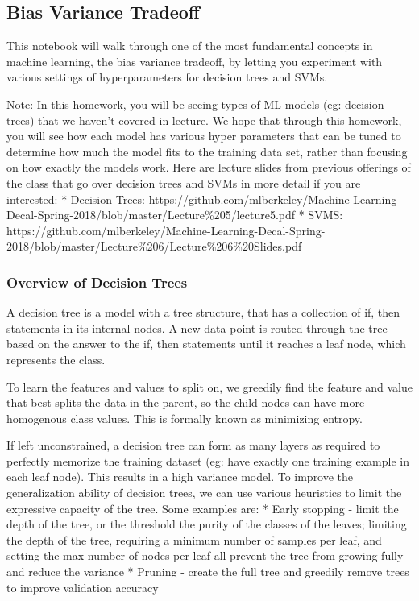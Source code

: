 \documentclass[11pt]{article}
\begin{document}
    \subsection{Bias Variance Tradeoff}\label{bias-variance-tradeoff}

This notebook will walk through one of the most fundamental concepts in
machine learning, the bias variance tradeoff, by letting you experiment
with various settings of hyperparameters for decision trees and SVMs.

Note: In this homework, you will be seeing types of ML models (eg:
decision trees) that we haven't covered in lecture. We hope that through
this homework, you will see how each model has various hyper parameters
that can be tuned to determine how much the model fits to the training
data set, rather than focusing on how exactly the models work. Here are
lecture slides from previous offerings of the class that go over
decision trees and SVMs in more detail if you are interested: * Decision
Trees:
https://github.com/mlberkeley/Machine-Learning-Decal-Spring-2018/blob/master/Lecture\%205/lecture5.pdf
* SVMS:
https://github.com/mlberkeley/Machine-Learning-Decal-Spring-2018/blob/master/Lecture\%206/Lecture\%206\%20Slides.pdf

    \subsubsection{Overview of Decision
Trees}\label{overview-of-decision-trees}

A decision tree is a model with a tree structure, that has a collection
of if, then statements in its internal nodes. A new data point is routed
through the tree based on the answer to the if, then statements until it
reaches a leaf node, which represents the class.

To learn the features and values to split on, we greedily find the
feature and value that best splits the data in the parent, so the child
nodes can have more homogenous class values. This is formally known as
minimizing entropy.

If left unconstrained, a decision tree can form as many layers as
required to perfectly memorize the training dataset (eg: have exactly
one training example in each leaf node). This results in a high variance
model. To improve the generalization ability of decision trees, we can
use various heuristics to limit the expressive capacity of the tree.
Some examples are: * Early stopping - limit the depth of the tree, or
the threshold the purity of the classes of the leaves; limiting the
depth of the tree, requiring a minimum number of samples per leaf, and
setting the max number of nodes per leaf all prevent the tree from
growing fully and reduce the variance * Pruning - create the full tree
and greedily remove trees to improve validation accuracy
\end{document}
